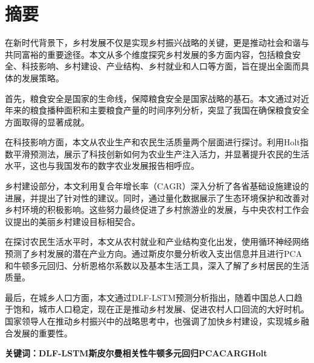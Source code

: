 \chapter*{摘要}
在新时代背景下，乡村发展不仅是实现乡村振兴战略的关键，更是推动社会和谐与共同富裕的重要途径。本文从多个维度探究乡村发展的多方面内容，包括粮食安全、科技影响、乡村建设、产业结构、乡村就业和人口等方面，旨在提出全面而具体的发展策略。

首先，粮食安全是国家的生命线，保障粮食安全是国家战略的基石。本文通过对近年来的粮食播种面积和主要粮食产量的时间序列分析，突显了我国在确保粮食安全方面取得的显著成就。

在科技影响方面，本文从农业生产和农民生活质量两个层面进行探讨。利用Holt指数平滑预测法，展示了科技创新如何为农业生产注入活力，并显著提升农民的生活水平，这也与我国发布的数字农业发展报告相呼应。

乡村建设部分，本文利用复合年增长率（CAGR）深入分析了各省基础设施建设的进展，并提出了针对性的建议。同时，通过量化数据展示了生态环境保护和改善对乡村环境的积极影响。这些努力最终促进了乡村旅游业的发展，与中央农村工作会议提出的美丽乡村建设目标相契合。

在探讨农民生活水平时，本文从农村就业和产业结构变化出发，使用循环神经网络预测了乡村发展的潜在产业方向。通过斯皮尔曼分析收入支出信息并且进行PCA和牛顿多元回归、分析恩格尔系数以及基本生活工具，深入了解了乡村居民的生活质量。

最后，在城乡人口方面，本文通过DLF-LSTM预测分析指出，随着中国总人口趋于饱和，城市人口稳定，现在正是推动乡村发展、促进农村人口回流的大好时机。国家领导人在推动乡村振兴中的战略思考中，也强调了加快乡村建设，实现城乡融合发展的重要性。

\textbf{关键词：DLF-LSTM\hspace{0.5cm}斯皮尔曼相关性\hspace{0.5cm}牛顿多元回归\hspace{0.5cm}PCA\hspace{0.5cm}CARG\hspace{0.5cm}Holt} 